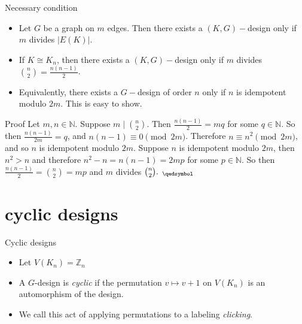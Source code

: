\documentclass{beamer}
\theoremstyle{plain}
\begin{document}
\begin{frame}{Necessary condition}
\begin{itemize}
\item Let $G$ be a graph on $m$ edges. Then there exists a $(K,G)-$design only if $m$ divides $|E(K)|$.
\pause
\item If $K\cong K_{n}$, then there exists a $(K,G)-$design only if $m$ divides $\binom{n}{2}=\frac{n(n-1)}{2}$.
\pause
\item Equivalently, there exists a $G-$design of order $n$ only if $n$ is idempotent modulo $2m$.  This is easy to show.
\pause
\end{itemize}

\begin{block}{Proof}
    Let $m,n\in \mathbb{N}$. Suppose $m \mid \binom{n}{2}$. Then $\frac{n(n-1)}{2} = mq$ for some $q \in \mathbb{N}$. So then $\frac{n(n-1)}{2m} = q$, and $n(n-1) \equiv 0 \pmod{2m}$. Therefore $n \equiv n^2 \pmod{2m}$, and so $n$ is idempotent modulo $2m$. Suppose $n$ is idempotent modulo $2m$, then $n^{2}>n$ and therefore $n^{2}-n=n(n-1)=2mp$ for some $p\in \mathbb{N}$. So then $\frac{n(n-1)}{2}=\binom{n}{2}=mp$ and $m$ divides $\binom{n}{2}._{\;\;\qedsymbol}$ 
    \end{block}
\end{frame}
\section{cyclic designs}
\begin{frame}{Cyclic designs}
    \pause
    \begin{itemize}
    \item Let $V(K_n)=\mathbb{Z}_n$
    \pause
    \item A $G$-design is \emph{cyclic} if the permutation $v\mapsto v+1$ on $V(K_n)$ is an automorphism of the design.
    \pause
    \item We call this act of applying permutations to a labeling \emph{clicking}.
    \end{itemize}
    \end{frame}
\end{document}

